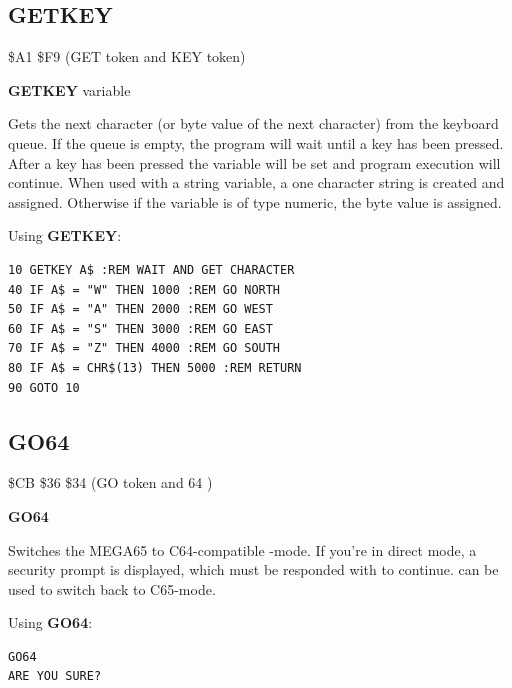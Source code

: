 \subsection{GETKEY}
\begin{description}[leftmargin=2cm,style=nextline]
\item [Token:] \$A1 \$F9 (GET token and KEY token)
\item [Format:] {\bf GETKEY} variable
\item [Usage:] Gets the next character (or byte value of the next character)
               from the keyboard queue. If the queue is empty,
               the program will wait until a key has been pressed.
               After a key has been pressed the variable will be set
               and program execution will continue. When used with
               a string variable, a one character string is created and assigned.
               Otherwise if the variable is of type numeric, the byte value
               is assigned.

\item [Example:] Using {\bf GETKEY}:
\begin{tcolorbox}[colback=black,coltext=white]
\verbatimfont{\codefont}
\begin{verbatim}
10 GETKEY A$ :REM WAIT AND GET CHARACTER
40 IF A$ = "W" THEN 1000 :REM GO NORTH
50 IF A$ = "A" THEN 2000 :REM GO WEST
60 IF A$ = "S" THEN 3000 :REM GO EAST
70 IF A$ = "Z" THEN 4000 :REM GO SOUTH
80 IF A$ = CHR$(13) THEN 5000 :REM RETURN
90 GOTO 10
\end{verbatim}
\end{tcolorbox}
\end{description}


\newpage
\subsection{GO64}
\begin{description}[leftmargin=2cm,style=nextline]
\item [Token:] \$CB \$36 \$34 (GO token and 64 )
\item [Format:] {\bf GO64}
\item [Usage:] Switches the
               MEGA65 to C64-compatible -mode. If you're in direct
               mode, a security prompt 
               is displayed, which must be responded with  to
               continue.  can be used to switch back
               to C65-mode.

\item [Example:] Using {\bf GO64}:
\begin{tcolorbox}[colback=black,coltext=white]
\verbatimfont{\codefont}
\begin{verbatim}
GO64
ARE YOU SURE?
\end{verbatim}
\end{tcolorbox}
\end{description}

